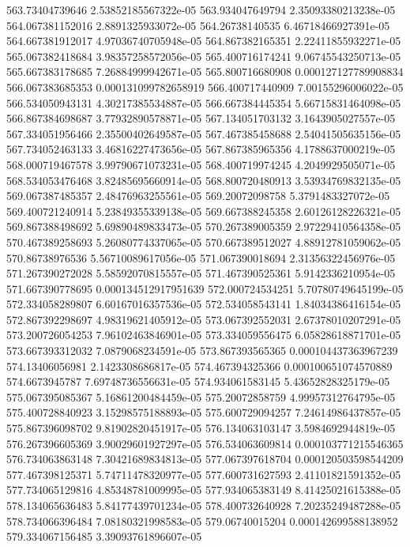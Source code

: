 {563.73404739646 2.53852185567322e-05
563.934047649794 2.35093380213238e-05
564.067381152016 2.8891325933072e-05
564.26738140535 6.46718466927391e-05
564.667381912017 4.97036740705948e-05
564.867382165351 2.22411855932271e-05
565.067382418684 3.98357258572056e-05
565.400716174241 9.06745543250713e-05
565.667383178685 7.26884999942671e-05
565.800716680908 0.000127127789908834
566.067383685353 0.000131099782658919
566.400717440909 7.00155296006022e-05
566.534050943131 4.30217385534887e-05
566.667384445354 5.66715831464098e-05
566.867384698687 3.77932890578871e-05
567.134051703132 3.1643905027557e-05
567.334051956466 2.35500402649587e-05
567.467385458688 2.54041505635156e-05
567.734052463133 3.46816227473656e-05
567.867385965356 4.1788637000219e-05
568.000719467578 3.99790671073231e-05
568.400719974245 4.2049929505071e-05
568.534053476468 3.82485695660914e-05
568.800720480913 3.53934769832135e-05
569.067387485357 2.48476963255561e-05
569.20072098758 5.3791483327072e-05
569.400721240914 5.23849355339138e-05
569.667388245358 2.60126128226321e-05
569.867388498692 5.69890489833473e-05
570.267389005359 2.97229410564358e-05
570.467389258693 5.26080774337065e-05
570.667389512027 4.88912781059062e-05
570.86738976536 5.56710089617056e-05
571.067390018694 2.31356322456976e-05
571.267390272028 5.58592070815557e-05
571.467390525361 5.9142336210954e-05
571.667390778695 0.000134512917951639
572.000724534251 5.70780749645199e-05
572.334058289807 6.60167016357536e-05
572.534058543141 1.84034386416154e-05
572.867392298697 4.98319621405912e-05
573.067392552031 2.67378010207291e-05
573.200726054253 7.96102463846901e-05
573.334059556475 6.05828618871701e-05
573.667393312032 7.0879068234591e-05
573.867393565365 0.000104437363967239
574.13406056981 2.1423308686817e-05
574.467394325366 0.000100651074570889
574.6673945787 7.69748736556631e-05
574.934061583145 5.43652828325179e-05
575.067395085367 5.16861200484459e-05
575.20072858759 4.99957312764795e-05
575.400728840923 3.15298575188893e-05
575.600729094257 7.24614986437857e-05
575.867396098702 9.81902820451917e-05
576.134063103147 3.5984692944819e-05
576.267396605369 3.90029601927297e-05
576.534063609814 0.000103771215546365
576.734063863148 7.30421689834813e-05
577.067397618704 0.000120503598544209
577.467398125371 5.74711478320977e-05
577.600731627593 2.41101821591352e-05
577.734065129816 4.85348781009995e-05
577.934065383149 8.41425021615388e-05
578.134065636483 5.84177439701234e-05
578.400732640928 7.20235249487288e-05
578.734066396484 7.08180321998583e-05
579.06740015204 0.000142699588138952
579.334067156485 3.39093761896607e-05
}
